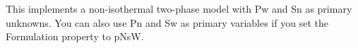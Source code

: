 This implements a non-isothermal two-phase model with Pw and Sn as primary unknowns. You can also use Pn and Sw as primary variables if you set the Formulation property to pNsW. 
